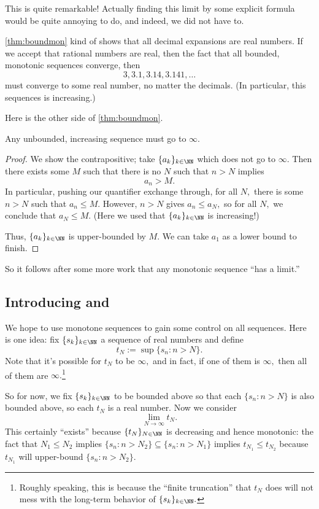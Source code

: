 \begin{remark}
    This is quite remarkable! Actually finding this limit by some explicit formula would be quite annoying to do, and indeed, we did not have to.
\end{remark}
\begin{remark}
    \autoref{thm:boundmon} kind of shows that all decimal expansions are real numbers. If we accept that rational numbers are real, then the fact that all bounded, monotonic sequences converge, then
    \[3,3.1,3.14,3.141,\ldots\]
    must converge to some real number, no matter the decimals. (In particular, this sequences is increasing.)
\end{remark}
Here is the other side of \autoref{thm:boundmon}.
\begin{proposition}
    Any unbounded, increasing sequence must go to $\infty.$
\end{proposition}
\begin{proof}
    We show the contrapositive; take $\{a_k\}_{k\in\NN}$ which does not go to $\infty.$ Then there exists some $M$ such that there is no $N$ such that $n>N$ implies
    \[a_n>M.\]
    In particular, pushing our quantifier exchange through, for all $N,$ there is some $n>N$ such that $a_n\le M.$ However, $n>N$ gives $a_n\le a_N,$ so for all $N,$ we conclude that $a_N\le M.$ (Here we used that $\{a_k\}_{k\in\NN}$ is increasing!)
    
    Thus, $\{a_k\}_{k\in\NN}$ is upper-bounded by $M.$ We can take $a_1$ as a lower bound to finish.
\end{proof}
So it follows after some more work that any monotonic sequence ``has a limit.''

\subsection{Introducing  and }
We hope to use monotone sequences to gain some control on all sequences. Here is one idea: fix $\{s_k\}_{k\in\NN}$ a sequence of real numbers and define
\[t_N:=\sup\{s_n:n>N\}.\]
Note that it's possible for $t_N$ to be $\infty,$ and in fact, if one of them is $\infty,$ then all of them are $\infty.$\footnote{Roughly speaking, this is because the ``finite truncation'' that $t_N$ does will not mess with the long-term behavior of $\{s_k\}_{k\in\NN}.$}

So for now, we fix $\{s_k\}_{k\in\NN}$ to be bounded above so that each $\{s_n:n>N\}$ is also bounded above, so each $t_N$ is a real number. Now we consider
\[\lim_{N\to\infty}t_N.\]
This certainly ``exists'' because $\{t_N\}_{N\in\NN}$ is decreasing and hence monotonic: the fact that $N_1\le N_2$ implies $\{s_n:n>N_2\}\subseteq\{s_n:n>N_1\}$ implies $t_{N_1}\le t_{N_2}$ because $t_{N_1}$ will upper-bound $\{s_n:n>N_2\}.$

